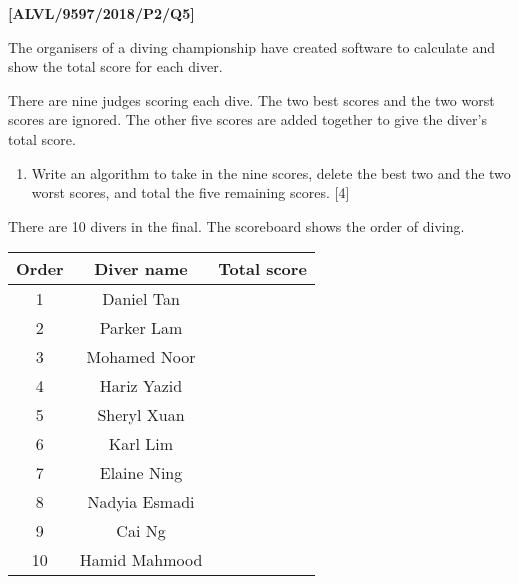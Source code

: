 \item \textbf{{[}ALVL/9597/2018/P2/Q5{]} }

The organisers of a diving championship have created software to calculate
and show the total score for each diver. 

There are nine judges scoring each dive. The two best scores and the
two worst scores are ignored. The other five scores are added together
to give the diver\textquoteright s total score. 
\begin{enumerate}
\item Write an algorithm to take in the nine scores, delete the best two
and the two worst scores, and total the five remaining scores. \hfill{}{[}4{]}
\end{enumerate}
There are 10 divers in the final. The scoreboard shows the order of
diving. 
\begin{center}
\begin{tabular}{|c|c|l|}
\hline 
\textbf{Order} & \textbf{Diver name} & \textbf{Total score}\tabularnewline
\hline 
1 & Daniel Tan & \tabularnewline
\hline 
2 & Parker Lam & \tabularnewline
\hline 
3 & Mohamed Noor & \tabularnewline
\hline 
4 & Hariz Yazid & \tabularnewline
\hline 
5 & Sheryl Xuan & \tabularnewline
\hline 
6 & Karl Lim & \tabularnewline
\hline 
7 & Elaine Ning & \tabularnewline
\hline 
8 & Nadyia Esmadi & \tabularnewline
\hline 
9 & Cai Ng & \tabularnewline
\hline 
10 & Hamid Mahmood & \tabularnewline
\hline 
\end{tabular}
\par\end{center}
